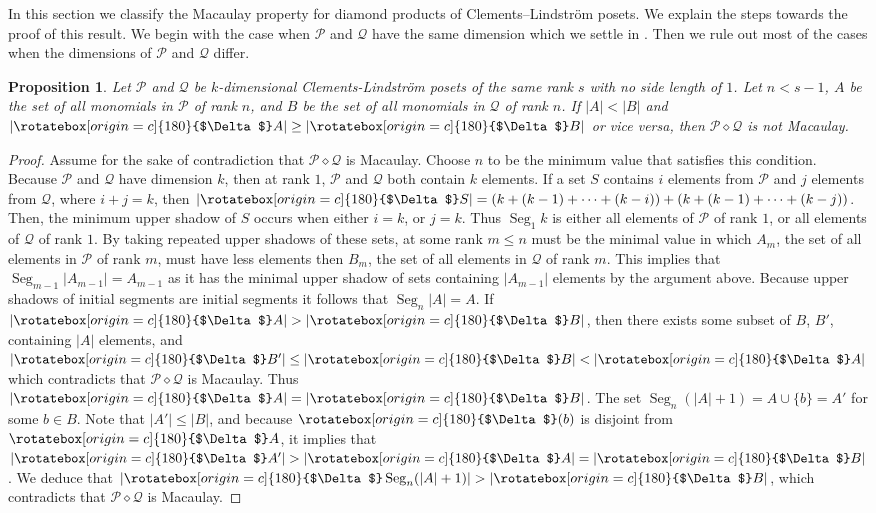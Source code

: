 \documentclass[11pt, reqno]{amsart}
\newcommand{\Q}{{\mathcal Q}}
\renewcommand{\P}{{\mathcal P}}
\newcommand{\uSdw}{\rotatebox[origin=c]{180}{$\Delta$}}
\def\Seg{\operatorname{Seg}}
\theoremstyle{plain} %
\newtheorem{prop}[thm]{Proposition}
\theoremstyle{definition}
\theoremstyle{remark}
\numberwithin{equation}{section}  %
\begin{document}
In this section we classify the Macaulay property for diamond products of Clements--Lindstr\"om posets. We explain the  steps towards the proof of this result.
We begin with the case when $\P$ and $\Q$ have the same dimension which we settle  in . Then we rule out most of the cases when the dimensions of $\P$ and $\Q$ differ.

\begin{prop} \label{prop: Not Mac test}
Let $\P$ and $\Q$ be $k$-dimensional Clements-Lindstr\"om posets of the same rank $s$ with no side length of $1$. Let $n < s - 1$, $A$ be the set of all monomials in $\P$ of rank $n$, and $B$ be the set of all monomials in $\Q$ of rank $n$. If $|A| < |B|$ and $|\uSdw A| \geq |\uSdw B|$ or vice versa, then $\P \diamond \Q$ is not Macaulay.
\end{prop}

\begin{proof}
Assume for the sake of contradiction that $\P \diamond \Q$ is Macaulay. 
Choose $n$ to be the minimum value that satisfies this condition. Because $\P$ and $\Q$ have dimension $k$, then at rank $1$, $\P$ and $\Q$ both contain $k$ elements. If  a set $S$ contains $i$ elements from $\P$ and $j$ elements from $\Q$, where $i + j = k$, then $|\uSdw S| = (k + (k - 1) + \dots + (k - i)) + (k + (k-1) + \dots + (k - j))$. Then, the minimum upper shadow of $S$ occurs when either $i = k$, or $j = k$. Thus $\Seg_1 k$ is either all elements of $\P$ of rank $1$, or all elements of $\Q$ of rank $1$.  By taking repeated upper shadows of these sets, at some rank $m \leq n$ must be the minimal value in which $A_m$, the set of all elements in $\P$ of rank $m$, must have less elements then $B_m$, the set of all elements in $\Q$ of rank $m$. This implies that $\Seg_{m-1} |A_{m-1}| = A_{m-1}$ as it has the minimal upper shadow of sets containing $|A_{m-1}|$ elements by the argument above. Because upper shadows of initial segments are initial segments it follows that $\Seg_n |A| = A$. If $|\uSdw A| > |\uSdw B|$, then there exists some subset of $B$, $B'$, containing $|A|$ elements, and $|\uSdw B'| \leq |\uSdw B| < |\uSdw A|$ which contradicts that $\P \diamond \Q$ is Macaulay. Thus $|\uSdw A| = |\uSdw B|$. The set $\Seg_n(|A| + 1) = A \cup \{b\} = A'$ for some $b \in B$. Note that $|A'| \leq |B|$, and because $\uSdw (b)$ is disjoint from $\uSdw A$, it implies that $|\uSdw A'| > |\uSdw A| = |\uSdw B|$. We deduce that $|\uSdw \Seg_n (|A| + 1)| > |\uSdw B|$, which contradicts that $\P \diamond \Q$ is Macaulay.
\end{proof}
\end{document}
